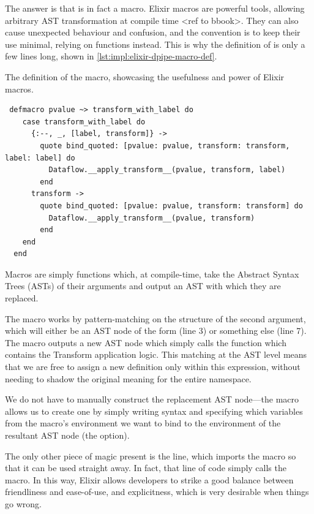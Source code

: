 The answer is that \exs{~>} is in fact a macro.
Elixir macros are powerful tools, allowing arbitrary AST transformation at compile time <ref to bbook>.
They can also cause unexpected behaviour and confusion, and the convention is to keep their use minimal, relying on functions instead.
This is why the definition of \exs{~>} is only a few lines long, shown in \cref{lst:impl:elixir-dpipe-macro-def}.

\begin{listing}[h]
	\caption{The definition of the \exs{~>} macro, showcasing the usefulness and power of Elixir macros.}
	\label{lst:impl:elixir-dpipe-macro-def}
	\begin{verbatim}
 defmacro pvalue ~> transform_with_label do
    case transform_with_label do
      {:--, _, [label, transform]} ->
        quote bind_quoted: [pvalue: pvalue, transform: transform, label: label] do
          Dataflow.__apply_transform__(pvalue, transform, label)
        end
      transform ->
        quote bind_quoted: [pvalue: pvalue, transform: transform] do
          Dataflow.__apply_transform__(pvalue, transform)
        end
    end
  end
	\end{verbatim}
\end{listing}

Macros are simply functions which, at compile-time, take the Abstract Syntax Trees (ASTs) of their arguments and output an AST with which they are replaced.

The \exs{~>} macro works by pattern-matching on the structure of the second argument, which will either be an AST node of the form  (line 3) or something else (line 7).
The macro outputs a new AST node which simply calls the  function which contains the Transform application logic.
This matching at the AST level means that we are free to assign \exs{--} a new definition only within this expression, without needing to shadow the original meaning for the entire namespace.

We do not have to manually construct the replacement AST node---the  macro allows us to create one by simply writing syntax and specifying which variables from the macro's environment we want to bind to the environment of the resultant AST node (the  option).

The only other piece of magic present is the  line, which imports the \exs{~>} macro so that it can be used straight away.
In fact, that line of code simply calls the  macro.
In this way, Elixir allows developers to strike a good balance between friendliness and ease-of-use, and explicitness, which is very desirable when things go wrong.

